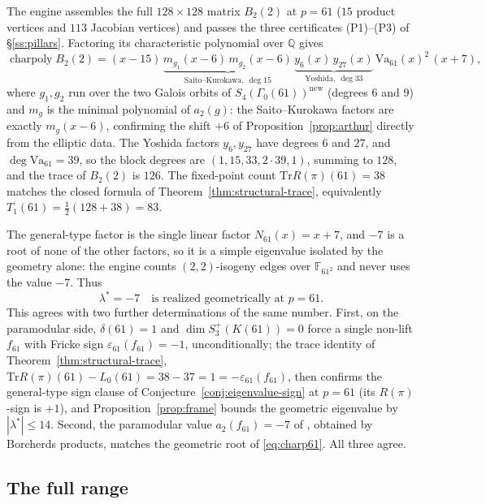 \documentclass[11pt]{amsart}
\theoremstyle{plain}
\theoremstyle{definition}
\newcommand{\Q}{\mathbb{Q}}
\newcommand{\F}{\mathbb{F}}
\newcommand{\Tr}{\mathrm{Tr}}
\newcommand{\Va}{\mathrm{Va}}
\newcommand{\eps}{\varepsilon}
\DeclareMathOperator{\charp}{charpoly}
\providecommand{\Va}{\mathrm{Va}}
\providecommand{\charp}{\operatorname{charpoly}}
\begin{document}
	The engine assembles the full $128\times128$ matrix $B_2(2)$ at $p=61$
	($15$ product vertices and $113$ Jacobian vertices) and passes the three
	certificates (P1)--(P3) of \S\ref{ss:pillars}. Factoring its
	characteristic polynomial over $\Q$ gives
	\begin{equation}\label{eq:charp61}
		\charp B_2(2)
		=(x-15)\,
		\underbrace{m_{g_1}\!(x{-}6)\,m_{g_2}\!(x{-}6)}_{\text{Saito--Kurokawa},\
			\deg 15}\,
		\underbrace{y_6(x)\,y_{27}(x)}_{\text{Yoshida},\ \deg 33}\,
		\Va_{61}(x)^2\,(x+7),
	\end{equation}
	where $g_1,g_2$ run over the two Galois orbits of
	$S_4(\Gamma_0(61))^{\mathrm{new}}$ (degrees $6$ and $9$) and $m_g$ is the
	minimal polynomial of $a_2(g)$: the Saito--Kurokawa factors are exactly
	$m_g(x-6)$, confirming the shift $+6$ of
	Proposition~\ref{prop:arthur} directly from the elliptic data. The Yoshida
	factors $y_6,y_{27}$ have degrees $6$ and $27$, and $\deg\Va_{61}=39$, so
	the block degrees are $(1,15,33,2\cdot39,1)$, summing to $128$, and the
	trace of $B_2(2)$ is $126$. The fixed-point count $\Tr R(\pi)(61)=38$ matches the
	closed formula of Theorem~\ref{thm:structural-trace}, equivalently
	$T_1(61)=\tfrac12(128+38)=83$.
	
	The general-type factor is the single linear factor $N_{61}(x)=x+7$, and
	$-7$ is a root of none of the other factors, so it is a simple eigenvalue
	isolated by the geometry alone: the engine counts $(2,2)$-isogeny edges
	over $\F_{61^2}$ and never uses the value $-7$. Thus
	\begin{equation}\label{eq:lambda61}
		\lambda^\ast=-7\quad\text{is realized geometrically at }p=61.
	\end{equation}
	This agrees with two further determinations of the same number. First, on
	the paramodular side, $\delta(61)=1$ and $\dim S_3^+(K(61))=0$
	\cite[Cor.~5.3]{Ibukiyama2019quinary} force a single non-lift $f_{61}$
	with Fricke sign $\eps_{61}(f_{61})=-1$, unconditionally; the trace
	identity of Theorem~\ref{thm:structural-trace},
	$\Tr R(\pi)(61)-L_0(61)=38-37=1=-\eps_{61}(f_{61})$, then confirms the
	general-type sign clause of Conjecture~\ref{conj:eigenvalue-sign} at
	$p=61$ (its $R(\pi)$-sign is $+1$), and Proposition~\ref{prop:frame}
	bounds the geometric eigenvalue by $|\lambda^\ast|\le14$. Second, the
	paramodular value $a_2(f_{61})=-7$ of \cite{PoorYuen2015}, obtained by
	Borcherds products, matches the geometric root of \eqref{eq:charp61}. All
	three agree.
	
	\subsection{The full range}
	\label{ss:full-range}
	
\end{document}
